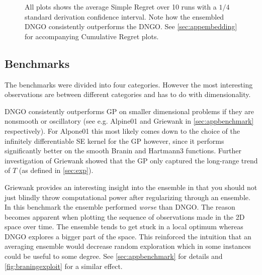 \documentclass[conference,compsoc]{IEEEtran}
\theoremstyle{definition}
\begin{document}
        \begin{figure*}[t]
            \centering
            \begin{subfigure}[t]{0.3\textwidth}
                \centering
                
            \end{subfigure}
            \begin{subfigure}[t]{0.3\textwidth}
                \centering
                
            \end{subfigure}
            \begin{subfigure}[t]{0.3\textwidth}
                \centering
                
            \end{subfigure}
            \caption{All plots shows the average Simple Regret over 10 runs with a $1/4$ standard derivation confidence interval.
            Note how the ensembled DNGO consistently outperforms the DNGO.
            See \cref{sec:appembedding} for accompanying Cumulative Regret plots.}
            \label{fig:embedding}
        \end{figure*}

    \subsection{Benchmarks}\label{sec:expbenchmark}

        The benchmarks were divided into four categories.
        However the most interesting observations are between different categories and has to do with dimensionality.

        DNGO consistently outperforms GP on smaller dimensional problems if they are nonsmooth or oscillatory (see e.g. Alpine01 and Griewank in \cref{sec:appbenchmark} respectively).
        For Alpone01 this most likely comes down to the choice of the infinitely differentiable SE kernel for the GP however, since it performs significantly better on the smooth Branin and Hartmann3 functions.
        Further investigation of Griewank showed that the GP only captured the long-range trend of $T$ (as defined in \cref{sec:exp}).

        Griewank provides an interesting insight into the ensemble in that you should not just blindly throw computational power after regularizing through an ensemble.
        In this benchmark the ensemble performed \emph{worse} than DNGO.
        The reason becomes apparent when plotting the sequence of observations made in the 2D space over time.
        The ensemble tends to get stuck in a local optimum whereas DNGO explores a bigger part of the space.
        This reinforced the intuition that an averaging ensemble would decrease random exploration which in some instances could be useful to some degree.
        See \cref{sec:appbenchmark} for details and \cref{fig:braningexploit} for a similar effect.
\end{document}
